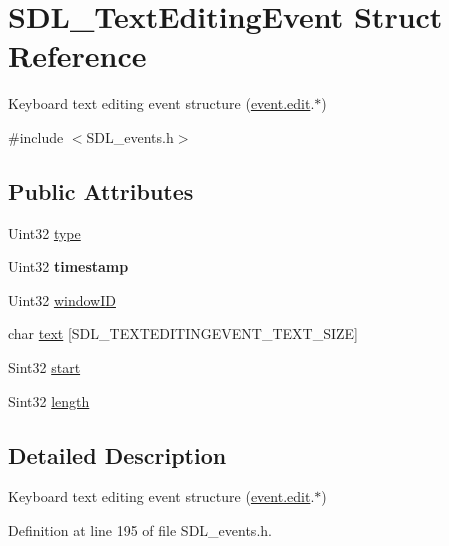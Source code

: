 \hypertarget{structSDL__TextEditingEvent}{\section{S\+D\+L\+\_\+\+Text\+Editing\+Event Struct Reference}
\label{structSDL__TextEditingEvent}
}


Keyboard text editing event structure (\hyperlink{unionSDL__Event_a9a7e3b67b2654d4c5fc509676c6a7183}{event.\+edit}.$\ast$)  




{\ttfamily \#include $<$S\+D\+L\+\_\+events.\+h$>$}

\subsection*{Public Attributes}
\begin{DoxyCompactItemize}
\item 
Uint32 \hyperlink{structSDL__TextEditingEvent_a198e6df194a3bf12cf5f82553e84c7cb}{type}
\item 
\hypertarget{structSDL__TextEditingEvent_afc164f40abee6fd8e72e01b589210c75}{Uint32 {\bfseries timestamp}}\label{structSDL__TextEditingEvent_afc164f40abee6fd8e72e01b589210c75}

\item 
Uint32 \hyperlink{structSDL__TextEditingEvent_a23b3e414cf7a7ccc547b7595ca930049}{window\+I\+D}
\item 
char \hyperlink{structSDL__TextEditingEvent_a1958926585189f459190e115e58d73a6}{text} \mbox{[}S\+D\+L\+\_\+\+T\+E\+X\+T\+E\+D\+I\+T\+I\+N\+G\+E\+V\+E\+N\+T\+\_\+\+T\+E\+X\+T\+\_\+\+S\+I\+Z\+E\mbox{]}
\item 
Sint32 \hyperlink{structSDL__TextEditingEvent_ac6c6a00835d92b12c0ba5b78b5ad676d}{start}
\item 
Sint32 \hyperlink{structSDL__TextEditingEvent_adca95505c0bf212834930df58f6d1aa5}{length}
\end{DoxyCompactItemize}


\subsection{Detailed Description}
Keyboard text editing event structure (\hyperlink{unionSDL__Event_a9a7e3b67b2654d4c5fc509676c6a7183}{event.\+edit}.$\ast$) 

Definition at line 195 of file S\+D\+L\+\_\+events.\+h.



